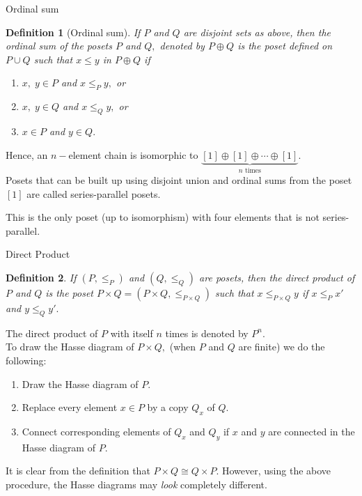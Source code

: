\documentclass[handout, aspectratio=169]{beamer}
\newtheorem{defn}{Definition}
\begin{document}
\begin{frame}{Ordinal sum}
	\begin{defn}[Ordinal sum]
		If $P$ and $Q$ are disjoint sets as above, then the ordinal sum of the posets $P$ and $Q,$ denoted by $P\oplus Q$ is the poset defined on $P\cup Q$ such that $x \le y$ in $P\oplus Q$ if
		\begin{enumerate} 
			\item $x,\;y\in P$ and $x \le_P y,$ or
			\item $x,\;y\in Q$ and $x \le_Q y,$ or
			\item $x\in P$ and $y\in Q.$
		\end{enumerate}
	\end{defn}
	Hence, an $n-$element chain is isomorphic to $\underbrace{[1]\oplus[1]\oplus\cdots\oplus[1]}_{n \text{ times}}.$\\
	Posets that can be built up using disjoint union and ordinal sums from the poset $[1]$ are called series-parallel posets.\\
	This is the only poset (up to isomorphism) with four elements that is not series-parallel.
\end{frame}
\begin{frame}{Direct Product}
	\begin{defn}
		If $(P, \le_P)$ and $(Q, \le_Q)$ are posets, then the direct product of $P$ and $Q$ is the poset $P \times Q = (P \times Q, \le_{P \times Q})$ such that $x \le_{P \times Q} y$ if $x \le_P x'$ and $y \le_Q y'.$\\
	\end{defn}
	The direct product of $P$ with itself $n$ times is denoted by $P^n.$\\
	To draw the Hasse diagram of $P \times Q,$ (when $P$ and $Q$ are finite) we do the following:
	\begin{enumerate} 
		\item Draw the Hasse diagram of $P.$
		\item Replace every element $x \in P$ by a copy $Q_x$ of $Q.$
		\item Connect corresponding elements of $Q_x$ and $Q_y$ if $x$ and $y$ are connected in the Hasse diagram of $P.$
	\end{enumerate}
	It is clear from the definition that $P\times Q \cong Q \times P.$ However, using the above procedure, the Hasse diagrams may \emph{look} completely different.
\end{frame}
\end{document}

